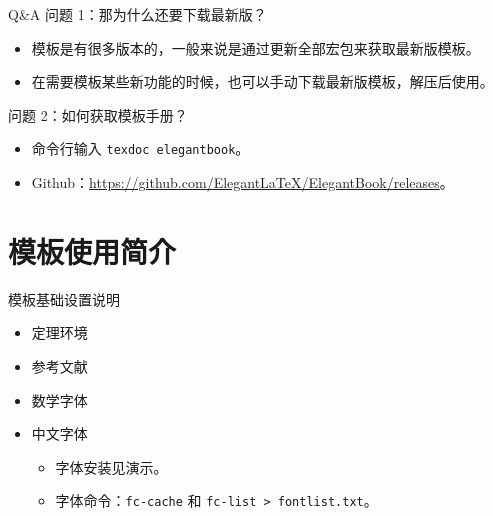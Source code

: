 \begin{frame}{Q\&A}
  \textcolor{iron}{问题 1：那为什么还要下载最新版？}
  \begin{itemize}
    \item 模板是有很多版本的，一般来说是通过更新全部宏包来获取最新版模板。
    \item 在需要模板某些新功能的时候，也可以手动下载最新版模板，解压后使用。
  \end{itemize}
  \vspace*{4ex}
  \textcolor{iron}{问题 2：如何获取模板手册？}
  \begin{itemize}
    \item 命令行输入 \lstinline{texdoc elegantbook}。
    \item Github：\href{https://github.com/ElegantLaTeX/ElegantBook/releases}{https://github.com/ElegantLaTeX/ElegantBook/releases}。
  \end{itemize}
\end{frame}

\section{模板使用简介}

\begin{frame}{模板基础设置说明}
  \begin{itemize}
    \item 定理环境
    \item 参考文献
    \item 数学字体
    \item 中文字体
    \begin{itemize}
      \item 字体安装见演示。
      \item 字体命令：\lstinline{fc-cache} 和 \lstinline{fc-list > fontlist.txt}。
    \end{itemize}
  \end{itemize}
\end{frame}
